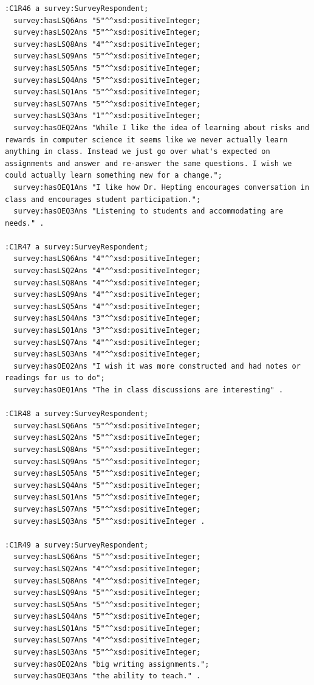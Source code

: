 \begin{lstlisting}
:C1R46 a survey:SurveyRespondent;
  survey:hasLSQ6Ans "5"^^xsd:positiveInteger;
  survey:hasLSQ2Ans "5"^^xsd:positiveInteger;
  survey:hasLSQ8Ans "4"^^xsd:positiveInteger;
  survey:hasLSQ9Ans "5"^^xsd:positiveInteger;
  survey:hasLSQ5Ans "5"^^xsd:positiveInteger;
  survey:hasLSQ4Ans "5"^^xsd:positiveInteger;
  survey:hasLSQ1Ans "5"^^xsd:positiveInteger;
  survey:hasLSQ7Ans "5"^^xsd:positiveInteger;
  survey:hasLSQ3Ans "1"^^xsd:positiveInteger;
  survey:hasOEQ2Ans "While I like the idea of learning about risks and rewards in computer science it seems like we never actually learn anything in class. Instead we just go over what's expected on assignments and answer and re-answer the same questions. I wish we could actually learn something new for a change.";
  survey:hasOEQ1Ans "I like how Dr. Hepting encourages conversation in class and encourages student participation.";
  survey:hasOEQ3Ans "Listening to students and accommodating are needs." .

:C1R47 a survey:SurveyRespondent;
  survey:hasLSQ6Ans "4"^^xsd:positiveInteger;
  survey:hasLSQ2Ans "4"^^xsd:positiveInteger;
  survey:hasLSQ8Ans "4"^^xsd:positiveInteger;
  survey:hasLSQ9Ans "4"^^xsd:positiveInteger;
  survey:hasLSQ5Ans "4"^^xsd:positiveInteger;
  survey:hasLSQ4Ans "3"^^xsd:positiveInteger;
  survey:hasLSQ1Ans "3"^^xsd:positiveInteger;
  survey:hasLSQ7Ans "4"^^xsd:positiveInteger;
  survey:hasLSQ3Ans "4"^^xsd:positiveInteger;
  survey:hasOEQ2Ans "I wish it was more constructed and had notes or readings for us to do";
  survey:hasOEQ1Ans "The in class discussions are interesting" .

:C1R48 a survey:SurveyRespondent;
  survey:hasLSQ6Ans "5"^^xsd:positiveInteger;
  survey:hasLSQ2Ans "5"^^xsd:positiveInteger;
  survey:hasLSQ8Ans "5"^^xsd:positiveInteger;
  survey:hasLSQ9Ans "5"^^xsd:positiveInteger;
  survey:hasLSQ5Ans "5"^^xsd:positiveInteger;
  survey:hasLSQ4Ans "5"^^xsd:positiveInteger;
  survey:hasLSQ1Ans "5"^^xsd:positiveInteger;
  survey:hasLSQ7Ans "5"^^xsd:positiveInteger;
  survey:hasLSQ3Ans "5"^^xsd:positiveInteger .

:C1R49 a survey:SurveyRespondent;
  survey:hasLSQ6Ans "5"^^xsd:positiveInteger;
  survey:hasLSQ2Ans "4"^^xsd:positiveInteger;
  survey:hasLSQ8Ans "4"^^xsd:positiveInteger;
  survey:hasLSQ9Ans "5"^^xsd:positiveInteger;
  survey:hasLSQ5Ans "5"^^xsd:positiveInteger;
  survey:hasLSQ4Ans "5"^^xsd:positiveInteger;
  survey:hasLSQ1Ans "5"^^xsd:positiveInteger;
  survey:hasLSQ7Ans "4"^^xsd:positiveInteger;
  survey:hasLSQ3Ans "5"^^xsd:positiveInteger;
  survey:hasOEQ2Ans "big writing assignments.";
  survey:hasOEQ3Ans "the ability to teach." .


\end{lstlisting}
